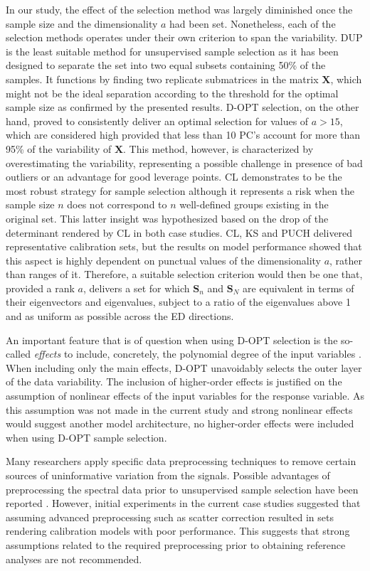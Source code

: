 \documentclass[journal=ancham,manuscript=article]{achemso}
\begin{document}
In our study, the effect of the selection method was largely diminished once the sample size and the dimensionality $a$ had been set. Nonetheless, each of the selection methods operates under their own criterion to span the variability. DUP is the least suitable method for unsupervised sample selection as it has been designed to separate the set into two equal subsets containing 50\% of the samples. It functions by finding two replicate submatrices in the matrix $\mathbf{X}$, which might not be the ideal separation according to the threshold for the optimal sample size as confirmed by the presented results. D-OPT selection, on the other hand, proved to consistently deliver an optimal selection for values of $a>15$, which are considered high provided that less than 10 PC's account for more than 95\% of the variability of $\mathbf{X}$. This method, however, is characterized by overestimating the variability, representing a possible challenge in presence of bad outliers or an advantage for good leverage points. CL demonstrates to be the most robust strategy for sample selection although it represents a risk when the sample size $n$ does not correspond to $n$ well-defined groups existing in the original set. This latter insight was hypothesized based on the drop of the determinant rendered by CL in both case studies. CL, KS and PUCH delivered representative calibration sets, but the results on model performance showed that this aspect is highly dependent on punctual values of the dimensionality $a$, rather than ranges of it. Therefore, a suitable selection criterion would then be one that, provided a rank $a$, delivers a set for which $\mathbf{S}_n$ and $\mathbf{S}_N$ are equivalent in terms of their eigenvectors and eigenvalues, subject to a ratio of the eigenvalues above 1 and as uniform as possible across the ED directions.

An important feature that is of question when using D-OPT selection is the so-called \emph{effects} to include, concretely, the polynomial degree of the input variables \cite{Goos2011}. When including only the main effects, D-OPT unavoidably selects the outer layer of the data variability. The inclusion of higher-order effects is justified on the assumption of nonlinear effects of the input variables for the response variable. As this assumption was not made in the current study and strong nonlinear effects would suggest another model architecture, no higher-order effects were included when using D-OPT sample selection.

Many researchers apply specific data preprocessing techniques to remove certain sources of uninformative variation from the signals. Possible advantages of preprocessing the spectral data prior to unsupervised sample selection have been reported \cite{Liu2019}. However, initial experiments in the current case studies suggested that assuming advanced preprocessing such as scatter correction resulted in sets rendering calibration models with poor performance. This suggests that strong assumptions related to the required preprocessing prior to obtaining reference analyses are not recommended.
\end{document}
